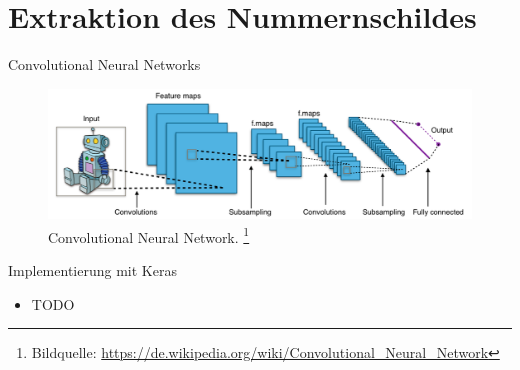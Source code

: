 \section{Extraktion des Nummernschildes}

\begin{frame}{Convolutional Neural Networks}
    \begin{figure}
        \includegraphics[width=\textwidth]{bilder/Typical_cnn.png}
        \caption{Convolutional Neural Network.
            \footnote{Bildquelle: \url{https://de.wikipedia.org/wiki/Convolutional_Neural_Network}}}
    \end{figure}
    \begin{center}
    \end{center}
\end{frame}

\begin{frame}{Implementierung mit Keras}
    \begin{itemize}
        \item TODO
    \end{itemize}
\end{frame}